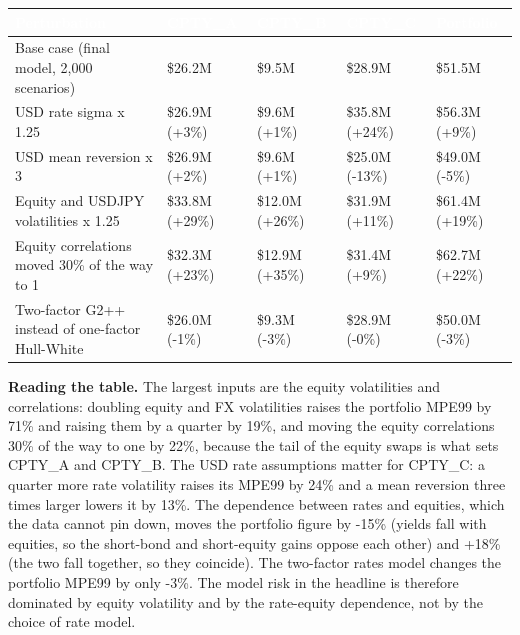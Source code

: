 \documentclass[11pt,letterpaper]{article}
\begin{document}
{\scriptsize\setlength{\LTpre}{4pt}\setlength{\LTpost}{6pt}
\begin{longtable}{>{\raggedright\arraybackslash}p{}>{\raggedright\arraybackslash}p{}>{\raggedright\arraybackslash}p{}>{\raggedright\arraybackslash}p{}>{\raggedright\arraybackslash}p{}}
\toprule
\rowcolor{navy}\textbf{\textcolor{white}{Perturbation}} & \textbf{\textcolor{white}{CPTY\_A}} & \textbf{\textcolor{white}{CPTY\_B}} & \textbf{\textcolor{white}{CPTY\_C}} & \textbf{\textcolor{white}{Portfolio}} \\
\endhead
Base case (final model, 2,000 scenarios) & \$26.2M & \$9.5M & \$28.9M & \$51.5M \\
\rowcolor{gray!9}USD rate sigma x 1.25 & \$26.9M (+3\%) & \$9.6M (+1\%) & \$35.8M (+24\%) & \$56.3M (+9\%) \\
USD mean reversion x 3 & \$26.9M (+2\%) & \$9.6M (+1\%) & \$25.0M (-13\%) & \$49.0M (-5\%) \\
\rowcolor{gray!9}Equity and USDJPY volatilities x 1.25 & \$33.8M (+29\%) & \$12.0M (+26\%) & \$31.9M (+11\%) & \$61.4M (+19\%) \\
Equity correlations moved 30\% of the way to 1 & \$32.3M (+23\%) & \$12.9M (+35\%) & \$31.4M (+9\%) & \$62.7M (+22\%) \\
\rowcolor{gray!9}Two-factor G2++ instead of one-factor Hull-White & \$26.0M (-1\%) & \$9.3M (-3\%) & \$28.9M (-0\%) & \$50.0M (-3\%) \\
\bottomrule
\end{longtable}}

\textbf{Reading the table.} The largest inputs are the equity volatilities and correlations: doubling equity and FX volatilities raises the portfolio MPE99 by 71\% and raising them by a quarter by 19\%, and moving the equity correlations 30\% of the way to one by 22\%, because the tail of the equity swaps is what sets CPTY\_A and CPTY\_B. The USD rate assumptions matter for CPTY\_C: a quarter more rate volatility raises its MPE99 by 24\% and a mean reversion three times larger lowers it by 13\%. The dependence between rates and equities, which the data cannot pin down, moves the portfolio figure by -15\% (yields fall with equities, so the short-bond and short-equity gains oppose each other) and +18\% (the two fall together, so they coincide). The two-factor rates model changes the portfolio MPE99 by only -3\%. The model risk in the headline is therefore dominated by equity volatility and by the rate-equity dependence, not by the choice of rate model.
\end{document}
